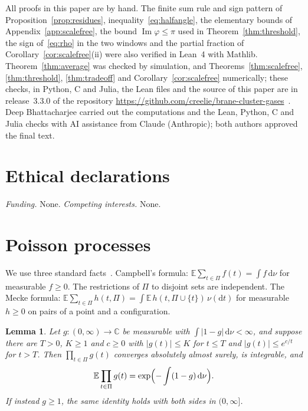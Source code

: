 \documentclass[aps,prd,twocolumn,superscriptaddress,nofootinbib,longbibliography,floatfix,amsmath,amssymb,10pt]{revtex4-2}
\newtheorem{lemma}[theorem]{Lemma}
\theoremstyle{definition}
\theoremstyle{remark}
\newcommand{\C}{\mathbb{C}}
\newcommand{\E}{\mathbb{E}}
\newcommand{\dd}{\mathrm{d}}
\DeclareMathOperator{\im}{Im}
\begin{document}
All proofs in this paper are by hand. The finite sum rule and sign pattern of
Proposition~\ref{prop:residues}, inequality~\eqref{eq:halfangle}, the elementary
bounds of Appendix~\ref{app:scalefree}, the bound $\im\varphi\le\pi$ used in
Theorem~\ref{thm:threshold}, the sign of~\eqref{eq:rho} in the two windows
and the partial fraction of Corollary~\ref{cor:scalefree}(ii) were also
verified in Lean~4 with Mathlib. Theorem~\ref{thm:average} was checked by
simulation, and Theorems~\ref{thm:scalefree}, \ref{thm:threshold},
\ref{thm:tradeoff} and Corollary~\ref{cor:scalefree} numerically; these
checks, in Python, C and Julia, the Lean files and the source of this paper
are in release~3.3.0 of the repository
\url{https://github.com/creelie/brane-cluster-gases}~\cite{BCGarchiveThree}.
Deep Bhattacharjee carried out the computations and the Lean, Python, C and
Julia checks with AI assistance from Claude (Anthropic); both authors approved
the final text.

\section*{Ethical declarations}

\emph{Funding.} None. \emph{Competing interests.} None.

\appendix

\section{Poisson processes}\label{app:poisson}

We use three standard facts~\cite{Kingman1993,LastPenrose2017}. Campbell's
formula: $\E\sum_{t\in\Pi}f(t)=\int f\,\dd\nu$ for measurable $f\ge0$. The
restrictions of $\Pi$ to disjoint sets are independent. The Mecke formula:
$\E\sum_{t\in\Pi}h(t,\Pi)=\int\E\,h(t,\Pi\cup\{t\})\,\nu(\dd t)$ for
measurable $h\ge0$ on pairs of a point and a configuration.

\begin{lemma}\label{lem:pgfl}
Let $g\colon(0,\infty)\to\C$ be measurable with $\int|1-g|\,\dd\nu<\infty$,
and suppose there are $T>0$, $K\ge1$ and $c\ge0$ with $|g(t)|\le K$ for
$t\le T$ and $|g(t)|\le e^{c/t}$ for $t>T$. Then $\prod_{t\in\Pi}g(t)$
converges absolutely almost surely, is integrable, and
\[
\E\prod_{t\in\Pi}g(t)=\exp\Bigl(-\int(1-g)\,\dd\nu\Bigr).
\]
If instead $g\ge1$, the same identity holds with both sides in $(0,\infty]$.
\end{lemma}
\end{document}
